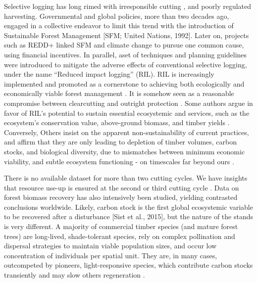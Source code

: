 \documentclass[12pt,]{article}
\theoremstyle{definition}
\theoremstyle{definition}
\theoremstyle{definition}
\theoremstyle{remark}
\begin{document}
Selective logging has long rimed with irresponsible cutting
\citep{Kormos2012}, and poorly regulated harvesting. Governmental and
global policies, more than two decades ago, engaged in a collective
endeavor to limit this trend with the introduction of Sustainable Forest
Management {[}SFM; United Nations, 1992{]}. Later on, projects such as
REDD+ \citep[Reducing Emissions from Deforestation and forest
Degradation,][]{UNFCCC2008} linked SFM and climate change to pursue one
common cause, using financial incentives. In parallel, aset of
techniques and planning guidelines were introduced to mitigate the
adverse effects of conventional selective logging, under the name
``Reduced impact logging'' (RIL). RIL is increasingly implemented and
promoted as a cornerstone to achieving both ecologically and
economically viable forest management \citep{Putz2008}. It is somehow
seen as a reasonable compromise between clearcutting and outright
protection \citep{Putz2012}. Some authors argue in favor of RIL's
potential to sustain essential ecosystemic and services, such as the
ecosystem's conservation value, above-ground biomass, and timber yields
\citep{Putz2012}. Conversely, Others insist on the apparent
non-sustainability of current practices, and affirm that they are only
leading to depletion of timber volumes, carbon stocks, and biological
diversity, due to mismatches between minimum economic viability, and
subtle ecosystem functioning - on timescales far beyond ours
\citep[see][ and \citet{Kormos2012}]{Nasi2009}.

There is no available dataset for more than two cutting cycles. We have
insights that resource use-up is ensured at the second or third cutting
cycle \citetext{\citealp{Kormos2012}; \citealp[but see][]{Putz2012}}.
Data on forest biomass recovery has also intensively been studied,
yielding contrasted conclusions worldwide. Likely, carbon stock is the
first global ecosystemic variable to be recovered after a disturbance
{[}Sist et al., 2015{]}, but the nature of the stands is very different.
A majority of commercial timber species (and mature forest trees) are
long-lived, shade-tolerant species, rely on complex pollination and
dispersal strategies to maintain viable population sizes, and occur low
concentration of individuals per spatial unit. They are, in many cases,
outcompeted by pioneers, light-responsive species, which contribute
carbon stocks transiently and may slow others regeneration
\citep{Nasi2009}.
\end{document}
